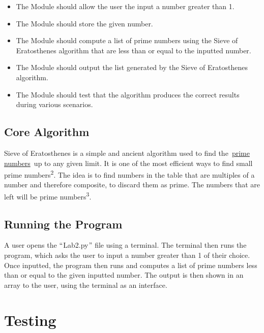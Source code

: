 \documentclass[]{article}
\begin{document}
\begin{itemize}
	\item The Module should allow the user the input a number greater than 1.\par

	\item The Module should store the given number.\par

	\item The Module should compute a list of prime numbers using the Sieve of Eratosthenes algorithm that are less than or equal to the inputted number.\par

	\item The Module should output the list generated by the Sieve of Eratosthenes algorithm.\par

	\item The Module should test that the algorithm produces the correct results during various scenarios.
\end{itemize}

\subsection{Core Algorithm}
Sieve of Eratosthenes is a simple and ancient algorithm used to find the \href{https://brilliant.org/wiki/prime-numbers/}{prime numbers} up to any given limit. It is one of the most efficient ways to find small prime numbers\textsuperscript{2}. The idea is to find numbers in the table that are multiples of a number and therefore composite, to discard them as prime. The numbers that are left will be prime numbers\textsuperscript{3}.

\subsection{Running the Program}
A user opens the $``$Lab2.py$"$  file using a terminal. The terminal then runs the program, which asks the user to input a number greater than 1 of their choice. Once inputted, the program then runs and computes a list of prime numbers less than or equal to the given inputted number. The output is then shown in an array to the user, using the terminal as an interface.

\section{Testing}
\end{document}
